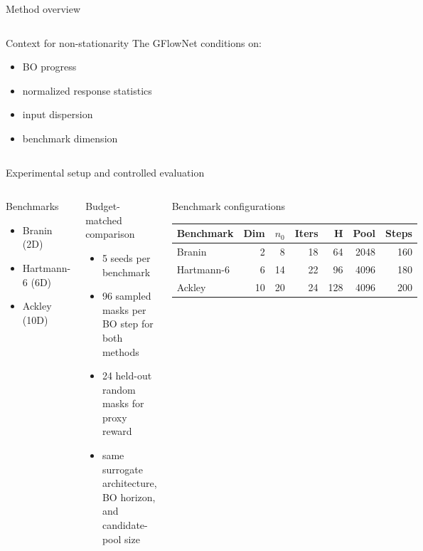 \documentclass[aspectratio=169]{beamer}
\begin{document}
\begin{frame}{Method overview}
\begin{columns}[T,onlytextwidth]
\begin{minipage}[t][0.82\textheight]{\linewidth}
  \vfill

  \begin{card}{Context for non-stationarity}
  The GFlowNet conditions on:
  \begin{itemize}
    \item BO progress
    \item normalized response statistics
    \item input dispersion
    \item benchmark dimension
  \end{itemize}
  \end{card}
\end{minipage}
\end{columns}
\end{frame}

\begin{frame}{Experimental setup and controlled evaluation}
\vspace{-0.55em}
\begin{columns}[T,onlytextwidth]
\begin{minipage}[t][0.82\textheight]{\linewidth}\vspace{0pt}
  \begin{cardA}{Benchmarks}
  \begin{itemize}
    \item Branin (2D)
    \item Hartmann-6 (6D)
    \item Ackley (10D)
  \end{itemize}
  \end{cardA}

  \vfill

  \begin{card}{Budget-matched comparison}
  \begin{itemize}
    \item 5 seeds per benchmark
    \item 96 sampled masks per BO step for both methods
    \item 24 held-out random masks for proxy reward
    \item same surrogate architecture, BO horizon, and candidate-pool size
  \end{itemize}
  \end{card}

  \vfill

  \begin{card}{Benchmark configurations}
  \centering
  \begin{tabular}{lrrrrrr}
  \toprule
  Benchmark & Dim & $n_0$ & Iters & H & Pool & Steps \\
  \midrule
  Branin & 2 & 8 & 18 & 64 & 2048 & 160 \\
  Hartmann-6 & 6 & 14 & 22 & 96 & 4096 & 180 \\
  Ackley & 10 & 20 & 24 & 128 & 4096 & 200 \\
  \bottomrule
  \end{tabular}
  \end{card}
\end{minipage}


\end{columns}
\end{frame}
\end{document}
